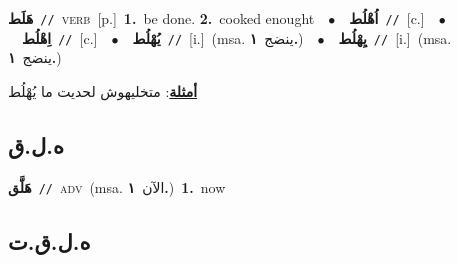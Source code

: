 \documentclass[10pt,a4paper,twoside]{article} %
\begin{document}
\begin{multicols}{2}
{\setlength\topsep{0pt}\textbf{\foreignlanguage{arabic}{هَلَط}}\ {\color{gray}\texttt{//}\color{black}}\ \textsc{verb}\ [p.]\ \textbf{1.}~be done.  \textbf{2.}~cooked enought\ \ $\bullet$\ \ \setlength\topsep{0pt}\textbf{\foreignlanguage{arabic}{اُهْلُط}}\ {\color{gray}\texttt{//}\color{black}}\ [c.]\ \ $\bullet$\ \ \setlength\topsep{0pt}\textbf{\foreignlanguage{arabic}{اِهْلُط}}\ {\color{gray}\texttt{//}\color{black}}\ [c.]\ \ $\bullet$\ \ \setlength\topsep{0pt}\textbf{\foreignlanguage{arabic}{يُهْلُط}}\ {\color{gray}\texttt{//}\color{black}}\ [i.]\ \color{gray}(msa. \foreignlanguage{arabic}{ينضج}~\foreignlanguage{arabic}{\textbf{١.}})\color{black}\ \ $\bullet$\ \ \setlength\topsep{0pt}\textbf{\foreignlanguage{arabic}{يِهْلُط}}\ {\color{gray}\texttt{//}\color{black}}\ [i.]\ \color{gray}(msa. \foreignlanguage{arabic}{ينضج}~\foreignlanguage{arabic}{\textbf{١.}})\color{black}\  \begin{flushright}\color{gray}\foreignlanguage{arabic}{\textbf{\underline{\foreignlanguage{arabic}{أمثلة}}}: متخليهوش لحديت ما يُهْلُط}\end{flushright}\color{black}} \vspace{2mm}

\vspace{-3mm}
\subsection*{\color{blue}\foreignlanguage{arabic}{ه.ل.ق}\color{blue}{ (ntws)}} 

{\setlength\topsep{0pt}\textbf{\foreignlanguage{arabic}{هَلَّق}}\ {\color{gray}\texttt{//}\color{black}}\ \textsc{adv}\ \color{gray}(msa. \foreignlanguage{arabic}{الآن}~\foreignlanguage{arabic}{\textbf{١.}})\color{black}\ \textbf{1.}~now\ } \vspace{2mm}

\vspace{-3mm}
\subsection*{\color{blue}\foreignlanguage{arabic}{ه.ل.ق.ت}\color{blue}{ (ntws)}} 


\end{multicols}
\end{document}
